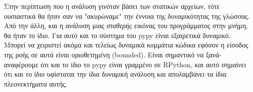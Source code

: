 Στην περίπτωση που η ανάλυση γινόταν βάσει των στατικών αρχείων, τότε ουσιαστικά
θα ήταν σαν να "ακυρώναμε" την έννοια της δυναμικότητας της γλώσσας. Από την
άλλη, και η ανάλυση μιας \textit{σταθερής} εικόνας του προγράμματος στην μνήμη,
θα ήταν το ίδιο. Για αυτό και το σύστημα του pypy είναι εξαιρετικά δυναμικό.
Μπορεί να χειριστεί ακόμα και τελείως δυναμικά κομμάτια κώδικα εφόσον η είσοδος
της ροής σε αυτά είναι οριοθετημένη (bounded)\cite{rigo2005}. Είναι σημαντικό να
ξανά-αναφέρουμε ότι και το ίδιο το pypy είναι γραμμένο σε RPython, και αυτό
σημαίνει ότι και το ίδιο υφίσταται την ίδια δυναμική ανάλυση και απολαμβάνει τα
ίδια πλεονεκτήματα αυτής.

